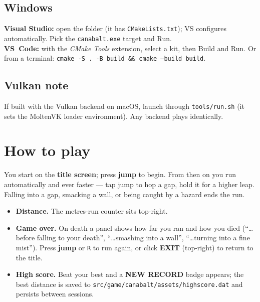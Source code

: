 \documentclass[11pt]{report}
\newcommand{\code}[1]{\texttt{#1}}
\begin{document}
\section{Windows}
\textbf{Visual Studio:} open the folder (it has \code{CMakeLists.txt}); VS
configures automatically. Pick the \code{canabalt.exe} target and Run.\\
\textbf{VS~Code:} with the \emph{CMake Tools} extension, select a kit, then Build
and Run. Or from a terminal: \code{cmake -S . -B build \&\& cmake --build build}.

\section{Vulkan note}
If built with the Vulkan backend on macOS, launch through \code{tools/run.sh}
(it sets the MoltenVK loader environment). Any backend plays identically.

\chapter{How to play}
You start on the \textbf{title screen}; press \textbf{jump} to begin. From then on
you run automatically and ever faster --- tap jump to hop a gap, hold it for a
higher leap. Falling into a gap, smacking a wall, or being caught by a hazard ends
the run.

\begin{itemize}[nosep]
  \item \textbf{Distance.} The metres-run counter sits top-right.
  \item \textbf{Game over.} On death a panel shows how far you ran and how you
        died (``\dots before falling to your death'', ``\dots smashing into a
        wall'', ``\dots turning into a fine mist''). Press \textbf{jump} or
        \code{R} to run again, or click \textbf{EXIT} (top-right) to return to the
        title.
  \item \textbf{High score.} Beat your best and a \textbf{NEW RECORD} badge
        appears; the best distance is saved to
        \code{src/game/canabalt/assets/highscore.dat} and persists between
        sessions.
\end{itemize}
\end{document}
